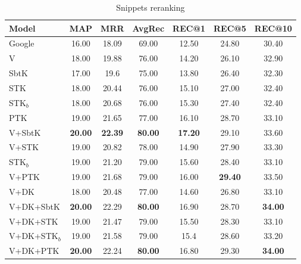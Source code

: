 \documentclass{wileysev}
\begin{document}
\begin{table}[t]
\begin{center}
\addtolength{\tabcolsep}{-3pt}
\begin{tabular}{lcccccc}
\hline
Model & MAP & MRR & AvgRec & REC@1 & REC@5 & REC@10 \\
\hline
\hline
Google & 16.00 & 18.09 & 69.00 & 12.50 & 24.80 & 30.40 \\
\hline
V & 18.00 & 19.88 & 76.00 & 14.20 & 26.10 & 32.90 \\
\hline
SbtK & 17.00 & 19.6 & 75.00 & 13.80 & 26.40 & 32.30 \\
\hline
STK & 18.00 & 20.44 & 76.00 & 15.10 & 27.00 & 32.40 \\
\hline
STK$_{b}$ & 18.00 & 20.68 & 76.00 & 15.30 & 27.40 & 32.40 \\
\hline
PTK & 19.00 & 21.65 & 77.00 & 16.10 & 28.70 & 33.10 \\
\hline
V+SbtK & \textbf{20.00} & \textbf{22.39} & \textbf{80.00} & \textbf{17.20} & 29.10 & 33.60 \\
\hline
V+STK & 19.00 & 20.82 & 78.00 & 14.90 & 27.90 & 33.30 \\
\hline
STK$_{b}$ & 19.00 & 21.20 & 79.00 & 15.60 & 28.40 & 33.10 \\
\hline
V+PTK & 19.00 & 21.68 & 79.00 & 16.00 & \textbf{29.40} & 33.50 \\
\hline
V+DK & 18.00 & 20.48 & 77.00 & 14.60 & 26.80 & 33.10 \\
\hline
V+DK+SbtK &\textbf{20.00} & 22.29 & \textbf{80.00} & 16.90 & 28.70 & \textbf{34.00} \\
\hline
V+DK+STK & 19.00 & 21.47 & 79.00 & 15.50 & 28.30 & 33.10 \\
\hline
V+DK+STK$_{b}$ & 19.00 & 21.58 & 79.00 & 15.4 & 28.60 & 33.20 \\
\hline
V+DK+PTK & \textbf{20.00} & 22.24 & \textbf{80.00} & 16.80 & 29.30 & \textbf{34.00} \\
\hline
\end{tabular}
\vspace{-.5em}
\caption{Snippets reranking}
\label{table:SN}
\vspace{-2.1em}
\end{center}
\end{table}

\end{document}
